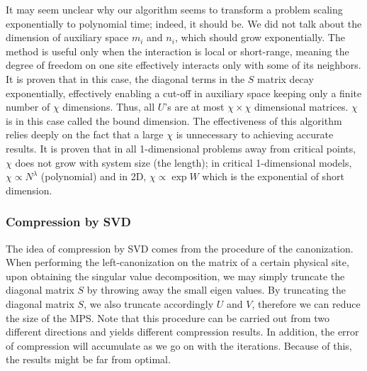 \documentclass[english]{article}[12pt]
\begin{document}
It may seem unclear why our algorithm seems to transform a
 problem scaling exponentially to polynomial time; indeed, it should be.
We did not talk about the dimension of auxiliary space $m_{i}$ and
$n_{i}$, which should grow exponentially. The method is useful
only when the interaction is local or short-range, meaning the
degree of freedom on one site  effectively interacts only with some
of its neighbors. It is proven that in this case, the diagonal terms
in the $S$ matrix decay exponentially, effectively enabling a cut-off
in auxiliary space keeping only a finite number of $\chi$ dimensions. Thus, all $U$'s are at most $\chi\times\chi$ dimensional matrices.
$\chi$ is in this case called the bound dimension. The effectiveness of this algorithm
relies deeply on the fact that a large $\chi$ is unnecessary to achieving accurate
results. It is proven that in all 1-dimensional problems away from critical
points, $\chi$ does not grow with system size (the length); in critical
1-dimensional models, $\chi\propto N^{\lambda}$ (polynomial) and
in 2D, $\chi\propto\exp W$ which is the exponential of short dimension.

\subsubsection{Compression by SVD}
The idea of compression by SVD comes from the procedure of the canonization. When performing the left-canonization on the matrix of a certain physical site, upon obtaining the singular value decomposition, we may simply truncate the diagonal matrix $S$ by throwing away the small eigen values. By truncating the diagonal matrix $S$, we also truncate accordingly $U$ and $V$, therefore we can reduce the size of the MPS. Note that this procedure can be carried out from two different directions and yields different compression results. In addition, the error of compression will accumulate as we go on with the iterations. Because of this, the results might be far from optimal.
\end{document}
